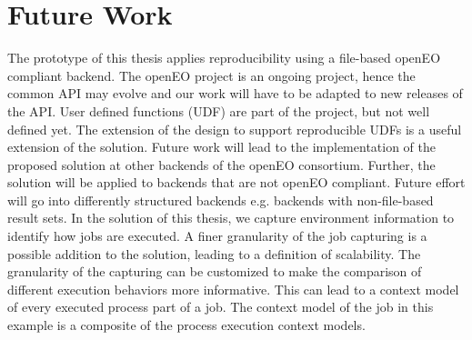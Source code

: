 \documentclass[draft,final]{vutinfth} %
\begin{document}
\section{Future Work}\label{FutureWork}
The prototype of this thesis applies reproducibility using a file-based openEO compliant backend. The openEO project is an ongoing project, hence the common API may evolve and our work will have to be adapted to new releases of the API. User defined functions (UDF) are part of the project, but not well defined yet. The extension of the design to support reproducible UDFs is a useful extension of the solution. Future work will lead to the implementation of the proposed solution at other backends of the openEO consortium. Further, the solution will be applied to backends that are not openEO compliant. Future effort will go into differently structured backends e.g. backends with non-file-based result sets. In the solution of this thesis, we capture environment information to identify how jobs are executed. A finer granularity of the job capturing is a possible addition to the solution, leading to a definition of scalability. The granularity of the capturing can be customized to make the comparison of different execution behaviors more informative. This can lead to a context model of every executed process part of a job. The context model of the job in this example is a composite of the process execution context models. 

\end{document}
